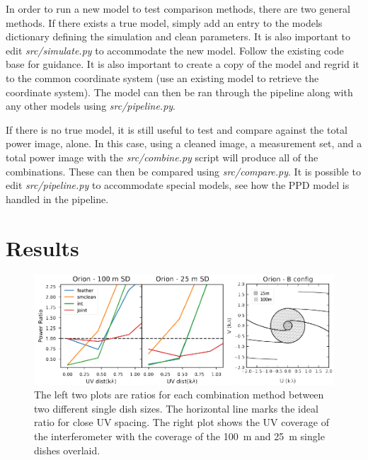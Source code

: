 \documentclass[preprint]{aastex63}
\begin{document}
In order to run a new model to test comparison methods, there are two general methods. If there exists a true model, simply add an entry to the models dictionary defining the simulation and clean parameters. It is also important to edit \textit{src/simulate.py} to accommodate the new model. Follow the existing code base for guidance. It is also important to create a copy of the model and regrid it to the common coordinate system (use an existing model to retrieve the coordinate system). The model can then be ran through the pipeline along with any other models using \textit{src/pipeline.py}.

If there is no true model, it is still useful to test and compare against the total power image, alone. In this case, using a cleaned image, a measurement set, and a total power image with the \textit{src/combine.py} script will produce all of the combinations. These can then be compared using \textit{src/compare.py}. It is possible to edit \textit{src/pipeline.py} to accommodate special models, see how the PPD model is handled in the pipeline. 





\section{Results}

\begin{figure}[ht]
    \includegraphics[width=\textwidth]{figures/sd_size_comp}
    \caption{The left two plots are ratios for each combination method between two different single dish sizes. The horizontal line marks the ideal ratio for close UV spacing. The right plot shows the UV coverage of the interferometer with the coverage of the \SI{100}{\meter} and \SI{25}{\meter} single dishes overlaid.}
    \label{fig:sd-size}
\end{figure}
\end{document}
